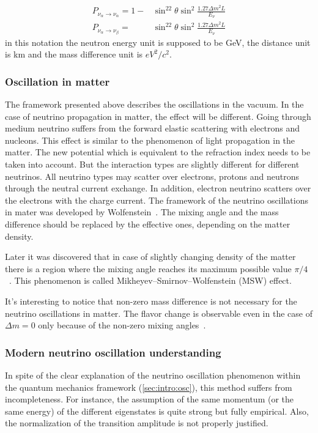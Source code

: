 \documentclass[../main.tex]{subfiles}
\begin{document}
\begin{align}
P_{\nu_\alpha\to\nu_\alpha}=1-&\sin^22\theta\sin^2\frac{1.27\Delta m^2L}{E_\nu} \\
P_{\nu_\alpha\to\nu_\beta}=&\sin^22\theta\sin^2\frac{1.27\Delta m^2L}{E_\nu}
\end{align}
in this notation the neutron energy unit is supposed to be GeV, the distance unit is km and the mass difference unit is $eV^2/c^2$.

\subsubsection{Oscillation in matter}
\label{sc:intro:mat}
The framework presented above describes the oscillations in the vacuum. In the case of neutrino propagation in matter, the effect will be different. Going through medium neutrino suffers from the forward elastic scattering with electrons and nucleons. This effect is similar to the phenomenon of light propagation in the matter. The new potential which is equivalent to the refraction index needs to be taken into account. But the interaction types are slightly different for different neutrinos. All neutrino types may scatter over electrons, protons and neutrons through the neutral current exchange. In addition, electron neutrino scatters over the electrons with the charge current. The framework of the neutrino oscillations in mater was developed by Wolfenstein~\cite{Wolfenstein1978}. The mixing angle and the mass difference should be replaced by the effective ones, depending on the matter density.

Later it was discovered that in case of slightly changing density of the matter there is a region where the mixing angle reaches its maximum possible value $\pi/4$~\cite{Mikheyev1985}. This phenomenon is called Mikheyev–Smirnov–Wolfenstein (MSW) effect.

It's interesting to notice that non-zero mass difference is not necessary for the neutrino oscillations in matter. The flavor change is observable even in the case of $\Delta m=0$ only because of the non-zero mixing angles~\cite{Smirnov2016}.


\subsubsection{Modern neutrino oscillation understanding}
In spite of the clear explanation of the neutrino oscillation phenomenon within the quantum mechanics framework (\autoref{sec:intro:osc}), this method suffers from incompleteness. For instance, the assumption of the same momentum (or the same energy) of the different eigenstates is quite strong but fully empirical. Also, the normalization of the transition amplitude is not properly justified.
\end{document}
